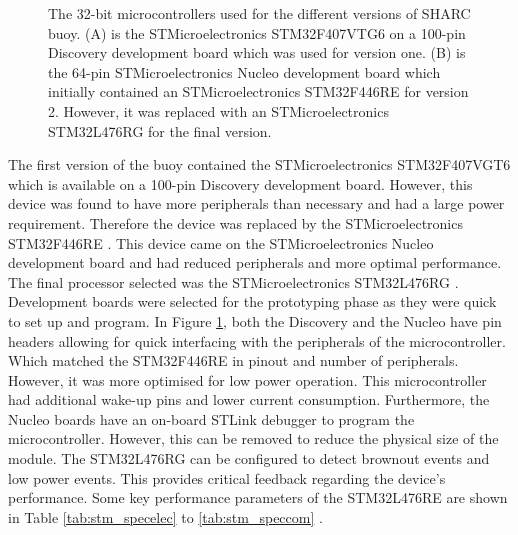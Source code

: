 \begin{figure}[H]
	\centering
	\begin{subfigure}[t]{.5\textwidth}
	\end{subfigure}
	\hfill
	\begin{subfigure}[t]{.49\textwidth}
	\end{subfigure}
	\hfill
	\caption{The 32-bit microcontrollers used for the different versions of SHARC buoy. (A) is the STMicroelectronics STM32F407VTG6 \cite{stmdisc} on a 100-pin Discovery development board which was used for version one. (B) is the 64-pin STMicroelectronics Nucleo development board which initially contained an STMicroelectronics STM32F446RE \cite{stm32nucleo} for version 2. However, it was replaced with an STMicroelectronics STM32L476RG \cite{stm32l4} for the final version.}
	\label{fig:mcus}
\end{figure}

The first version of the buoy contained the STMicroelectronics STM32F407VGT6 \cite{stmdisc} which is available on a 100-pin Discovery development board. However, this device was found to have more peripherals than necessary and had a large power requirement. Therefore the device was replaced by the STMicroelectronics STM32F446RE \cite{stm32nucleo}. This device came on the STMicroelectronics Nucleo development board and had reduced peripherals and more optimal performance. The final processor selected was the STMicroelectronics STM32L476RG \cite{stm32l4}. Development boards were selected for the prototyping phase as they were quick to set up and program. In Figure \ref{fig:mcus}, both the Discovery and the Nucleo have pin headers allowing for quick interfacing with the peripherals of the microcontroller. Which matched the STM32F446RE in pinout and number of peripherals. However, it was more optimised for low power operation. This microcontroller had additional wake-up pins and lower current consumption. Furthermore, the Nucleo boards have an on-board STLink debugger to program the microcontroller. However, this can be removed to reduce the physical size of the module. The STM32L476RG can be configured to detect brownout events and low power events. This provides critical feedback regarding the device's performance. Some key performance parameters of the STM32L476RE are shown in Table \ref{tab:stm_specelec} to \ref{tab:stm_speccom} .

